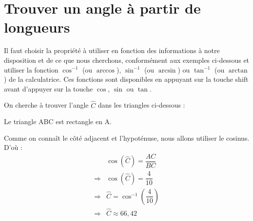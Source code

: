 \section{Trouver un angle à partir de longueurs}


Il faut choisir la propriété à utiliser en fonction des informations à notre disposition et de ce que nous cherchons, conformément aux exemples ci-dessous et utiliser la fonction $\cos^{-1}$ (ou $\arccos$), $\sin^{-1}$ (ou $\arcsin$) ou $\tan^{-1}$ (ou $\arctan$) de la calculatrice. Ces fonctions sont disponibles en appuyant sur la touche shift avant d'appuyer sur la touche  $\cos$, $\sin$ ou $\tan$.


On cherche à trouver l'angle $\widehat{C}$ dans les triangles ci-dessous :

\begin{minipage}[b]{0.45\textwidth}
\begin{center}
\end{center}   

Le triangle ABC est rectangle en A.

Comme on connaît le côté adjacent et l'hypoténuse, nous allons utiliser le cosinus. D'où : 
\begin{align*}
    &\cos (\widehat{C})=\dfrac{AC}{BC}\\
    \Rightarrow &\cos (\widehat{C})=\dfrac{4}{10}\\
    \Rightarrow & \widehat{C} = \cos ^{-1} \left(\dfrac{4}{10}\right)\\
    \Rightarrow & \widehat{C} \approx 66,42
\end{align*}
\end{minipage}
\hfil \vrule \hfil

